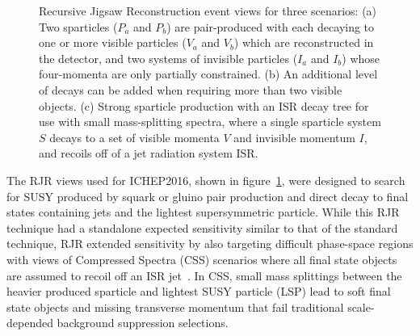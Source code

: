 \begin{figure}[tb]
\centering
{}
\caption{\label{fig:RJRTrees} 
Recursive Jigsaw Reconstruction event views for three scenarios: (a)
Two sparticles ($P_{a}$ and $P_{b}$) are pair-produced with each
decaying to one or more visible particles ($V_{a}$ and $V_{b}$) which
are reconstructed in the detector, and two systems of invisible
particles ($I_{a}$ and $I_{b}$) whose four-momenta are only partially
constrained. (b) An additional level of decays can be added when
requiring more than two visible objects. (c) Strong sparticle
production with an ISR decay tree for use with small mass-splitting
spectra, where a single sparticle system $S$ decays to a set of
visible momenta $V$ and invisible momentum $I$, and recoils off of a
jet radiation system ISR.  }
\end{figure}

The RJR views used for ICHEP2016, shown in figure~\ref{fig:RJRTrees},
were designed to search for SUSY produced by squark or gluino pair
production and direct decay to final states containing jets and the
lightest supersymmetric particle. While this RJR technique had a
standalone expected sensitivity similar to that of the standard
technique, RJR extended sensitivity by also targeting difficult
phase-space regions with views of Compressed Spectra (CSS) scenarios
where all final state objects are assumed to recoil off an ISR
jet~\cite{Jackson:2016mfb}. In CSS, small mass splittings between the
heavier produced sparticle and lightest SUSY particle (LSP) lead to
soft final state objects and missing transverse momentum that fail
traditional scale-depended background suppression selections.

